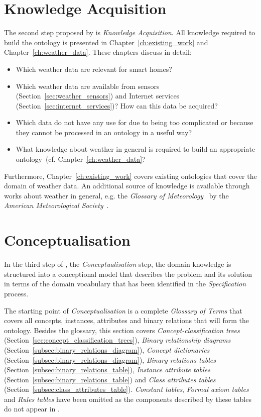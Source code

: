 \section{Knowledge Acquisition}

The second step proposed by \methontology is \emph{Knowledge Acquisition}. All knowledge required to build the \smarthomeweather ontology is presented in Chapter~\ref{ch:existing_work} and Chapter~\ref{ch:weather_data}. These chapters discuss in detail:

\begin{itemize}
  \item Which weather data are relevant for smart homes?
  \item Which weather data are available from sensors (Section~\ref{sec:weather_sensors}) and Internet services (Section~\ref{sec:internet_services})? How can this data be acquired?
  \item Which data do not have any use for \smarthomeweather due to being too complicated or because they cannot be processed in an ontology in a useful way?
  \item What knowledge about weather in general is required to build an appropriate ontology~(cf. Chapter~\ref{ch:weather_data}?
\end{itemize}

Furthermore, Chapter~\ref{ch:existing_work} covers existing ontologies that cover the domain of weather data. An additional source of knowledge is available through works about weather in general, e.g. the \emph{Glossary of Meteorology}~\cite{GlossaryOfMeteorology} by the \emph{American Meteorological Society}~\cite{AMS}.

\section{Conceptualisation}
\label{sec:ontology_concept}

In the third step of \methontology, the \emph{Conceptualisation} step, the domain knowledge is structured into a conceptional model that describes the problem and its solution in terms of the domain vocabulary that has been identified in the \emph{Specification} process.

The starting point of \emph{Conceptualisation} is a complete \emph{Glossary of Terms} that covers all concepts, instances, attributes and binary relations that will form the ontology. Besides the glossary, this section covers \emph{Concept-classification trees} (Section~\ref{sec:concept_classification_trees}), \emph{Binary relationship diagrams} (Section~\ref{subsec:binary_relations_diagram}), \emph{Concept dictionaries} (Section~\ref{subsec:binary_relations_diagram}), \emph{Binary relations tables} (Section~\ref{subsec:binary_relations_table}), \emph{Instance attribute tables} (Section~\ref{subsec:binary_relations_table}) and \emph{Class attributes tables} (Section~\ref{subsec:class_attributes_table}). \emph{Constant tables}, \emph{Formal axiom tables} and \emph{Rules tables} have been omitted as the components described by these tables do not appear in \smarthomeweather.

